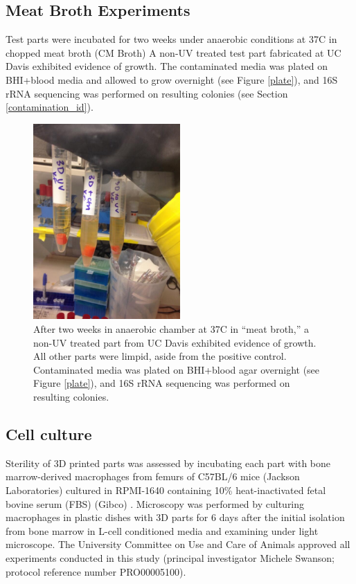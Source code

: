 \begin{refsection}
\begin{figure}[!h]
\end{figure}

\subsection{Meat Broth Experiments}\label{meat_broth}

Test parts were incubated for two weeks under anaerobic conditions at
37C in chopped meat broth (CM Broth) \cite{seaweed_human_gut} A non-UV
treated test part fabricated at UC Davis exhibited evidence of
growth. The contaminated media was plated on BHI+blood media and
allowed to grow overnight (see Figure \ref{plate}), and 16S rRNA
sequencing was performed on resulting colonies (see Section
\ref{contamination_id}).

\begin{figure}
  \centering
    \includegraphics[width=0.5\textwidth]{sterility/figures/Fig8}

    \caption{After two weeks in anaerobic chamber at 37C in ``meat
      broth,'' a non-UV treated part from UC Davis exhibited evidence
      of growth. All other parts were limpid, aside from the positive
      control. Contaminated media was plated on BHI+blood agar
      overnight (see Figure \ref{plate}), and 16S rRNA sequencing was
      performed on resulting colonies.}

\end{figure}

\subsection{Cell culture}

Sterility of 3D printed parts was assessed by incubating each part
with bone marrow-derived macrophages from femurs of C57BL/6 mice
(Jackson Laboratories) cultured in RPMI-1640 containing 10\%
heat-inactivated fetal bovine serum (FBS) (Gibco) \cite{cell_culture}.
Microscopy was performed by culturing macrophages in plastic dishes
with 3D parts for 6 days after the initial isolation from bone marrow
in L-cell conditioned media and examining under light microscope. The
University Committee on Use and Care of Animals approved all
experiments conducted in this study (principal investigator Michele
Swanson; protocol reference number PRO00005100).


\end{refsection}

